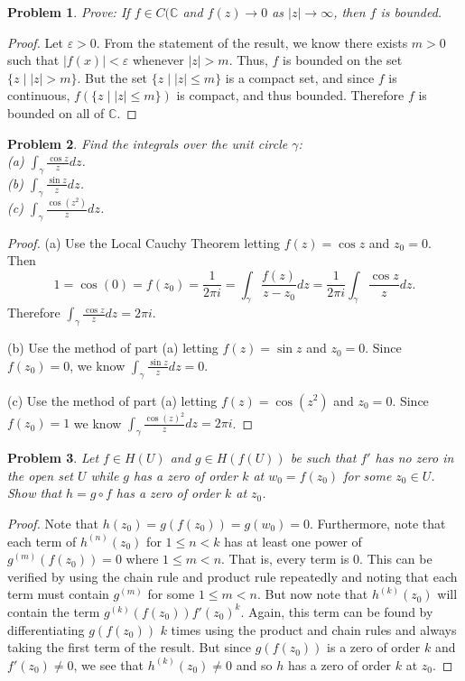 \documentclass{article}
\newtheorem{problem}{Problem}
\begin{document}
\begin{problem}
Prove: If $f \in C(\mathbb{C}$ and $f(z) \rightarrow 0$ as $|z| \rightarrow \infty$, then $f$ is bounded.
\end{problem}
\begin{proof}
Let $\varepsilon > 0$. From the statement of the result, we know there exists $m > 0$ such that $|f(x)| < \varepsilon$ whenever $|z| > m$. Thus, $f$ is bounded on the set $\{z \mid |z| > m\}$. But the set $\{z \mid |z| \leq m\}$ is a compact set, and since $f$ is continuous, $f(\{z \mid |z| \leq m\})$ is compact, and thus bounded. Therefore $f$ is bounded on all of $\mathbb{C}$.
\end{proof}

\begin{problem}
Find the integrals over the unit circle $\gamma$:\\
(a) $\int_{\gamma} \frac{\cos z}{z} dz$.\\
(b) $\int_{\gamma} \frac{\sin z}{z} dz$.\\
(c) $\int_{\gamma} \frac{\cos (z^2)}{z} dz$.
\end{problem}
\begin{proof}
(a) Use the Local Cauchy Theorem letting $f(z) = \cos z$ and $z_0 = 0$. Then
\[
1 = \cos(0) = f(z_0) = \frac{1}{2 \pi i} = \int_{\gamma} \frac{f(z)}{z-z_0} dz = \frac{1}{2 \pi i}\int_{\gamma} \frac{\cos z}{z} dz.
\]
Therefore $\int_{\gamma} \frac{\cos z}{z} dz = 2 \pi i$.

(b) Use the method of part (a) letting $f(z) = \sin z$ and $z_0 = 0$. Since $f(z_0) = 0$, we know $\int_{\gamma} \frac{\sin z}{z} dz = 0$.

(c) Use the method of part (a) letting $f(z) = \cos(z^2)$ and $z_0 = 0$. Since $f(z_0) = 1$ we know $\int_{\gamma} \frac{\cos (z)^2}{z} dz = 2 \pi i$.
\end{proof}

\begin{problem}
Let $f \in H(U)$ and $g \in H(f(U))$ be such that $f'$ has no zero in the open set $U$ while $g$ has a zero of order $k$ at $w_0 = f(z_0)$ for some $z_0 \in U$. Show that $h = g \circ f$ has a zero of order $k$ at $z_0$.
\end{problem}
\begin{proof}
Note that $h(z_0) = g(f(z_0)) = g(w_0) = 0$. Furthermore, note that each term of $h^{(n)}(z_0)$ for $1 \leq n < k$ has at least one power of $g^{(m)}(f(z_0)) = 0$ where $1 \leq m < n$. That is, every term is $0$. This can be verified by using the chain rule and product rule repeatedly and noting that each term must contain $g^{(m)}$ for some $1 \leq m < n$. But now note that $h^{(k)}(z_0)$ will contain the term $g^{(k)}(f(z_0))f'(z_0)^k$. Again, this term can be found by differentiating $g(f(z_0))$ $k$ times using the product and chain rules and always taking the first term of the result. But since $g(f(z_0))$ is a zero of order $k$ and $f'(z_0) \neq 0$, we see that $h^{(k)}(z_0) \neq 0$ and so $h$ has a zero of order $k$ at $z_0$.
\end{proof}
\end{document}
